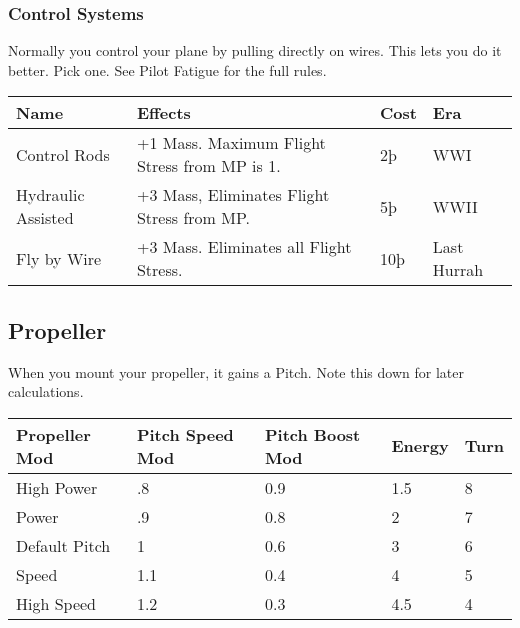 \documentclass{article}
\begin{document}
\subsubsection{Control Systems}
\label{_Control_Systems}

Normally you control your plane by pulling directly on wires. This lets
you do it better. Pick one. See Pilot Fatigue for the full rules.

\begin{tabular}{|l|l|l|l|}
  \hline
  Name               & Effects                                      & Cost & Era  \\\hline
  Control Rods       & +1 Mass. Maximum Flight Stress from MP is 1. & 2þ   &
  WWI                                                                             \\\hline
  Hydraulic Assisted & +3 Mass, Eliminates Flight Stress from MP.   & 5þ   &
  WWII                                                                            \\\hline
  Fly by Wire        & +3 Mass. Eliminates all Flight Stress.       & 10þ  & Last
  Hurrah                                                                          \\\hline
\end{tabular}

\subsection{Propeller}
\label{_Propeller}

When you mount your propeller, it gains a Pitch. Note this down for
later calculations.

\begin{tabular}{|l|l|l|l|l|}
  \hline
  Propeller Mod & Pitch Speed Mod & Pitch Boost Mod & Energy & Turn \\\hline
  High Power    & .8              & 0.9             & 1.5    & 8    \\\hline
  Power         & .9              & 0.8             & 2      & 7    \\\hline
  Default Pitch & 1               & 0.6             & 3      & 6    \\\hline
  Speed         & 1.1             & 0.4             & 4      & 5    \\\hline
  High Speed    & 1.2             & 0.3             & 4.5    & 4    \\\hline
\end{tabular}
\end{document}
